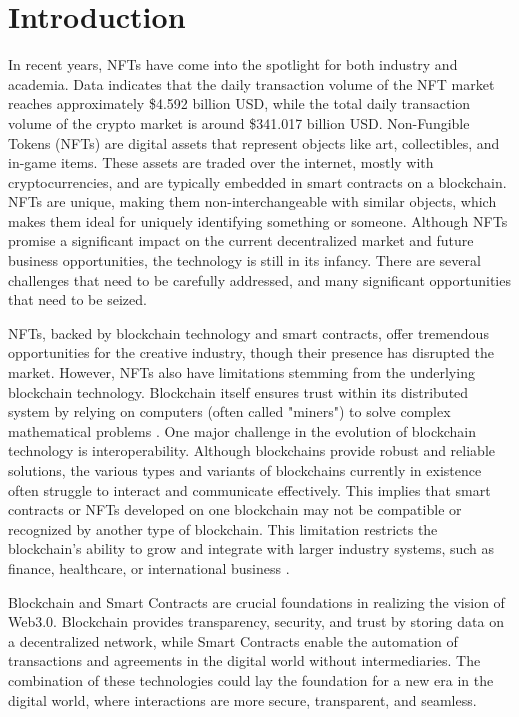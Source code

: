 \section{Introduction}
\label{sec:pendahuluan}


In recent years, NFTs have come into the spotlight for both industry and academia. Data indicates that the daily transaction volume of the NFT market reaches approximately \$4.592 billion USD, while the total daily transaction volume of the crypto market is around \$341.017 billion USD. Non-Fungible Tokens (NFTs) are digital assets that represent objects like art, collectibles, and in-game items. These assets are traded over the internet, mostly with cryptocurrencies, and are typically embedded in smart contracts on a blockchain. NFTs are unique, making them non-interchangeable with similar objects, which makes them ideal for uniquely identifying something or someone. Although NFTs promise a significant impact on the current decentralized market and future business opportunities, the technology is still in its infancy. There are several challenges that need to be carefully addressed, and many significant opportunities that need to be seized. \cite{Tjokrosetio22}

NFTs, backed by blockchain technology and smart contracts, offer tremendous opportunities for the creative industry, though their presence has disrupted the market. However, NFTs also have limitations stemming from the underlying blockchain technology. Blockchain itself ensures trust within its distributed system by relying on computers (often called "miners") to solve complex mathematical problems \cite{Malik2023}. One major challenge in the evolution of blockchain technology is interoperability. Although blockchains provide robust and reliable solutions, the various types and variants of blockchains currently in existence often struggle to interact and communicate effectively. This implies that smart contracts or NFTs developed on one blockchain may not be compatible or recognized by another type of blockchain. This limitation restricts the blockchain's ability to grow and integrate with larger industry systems, such as finance, healthcare, or international business \cite{Gadekallu2022}. 

Blockchain and Smart Contracts are crucial foundations in realizing the vision of Web3.0. Blockchain provides transparency, security, and trust by storing data on a decentralized network, while Smart Contracts enable the automation of transactions and agreements in the digital world without intermediaries. The combination of these technologies could lay the foundation for a new era in the digital world, where interactions are more secure, transparent, and seamless.

